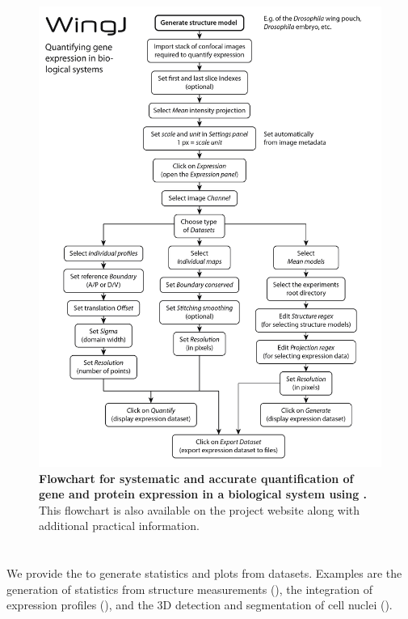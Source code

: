 \begin{figure}[!h]
\centering
\includegraphics[scale=0.7]{images/expression_flowchart_BW_2.png}
\caption{\textbf{Flowchart for systematic and accurate quantification of gene and protein expression in a biological system using \wingj.} This flowchart is also available on the project website along with additional practical information.}
\label{fig:expression_detection_flowchart}
\end{figure}

\section{\wingjMatlab}
We provide the \wingjMatlab to generate statistics and plots from \wingj datasets. Examples are the generation of statistics from structure measurements (), the integration of expression profiles (), and the 3D detection and segmentation of cell nuclei ().\\

